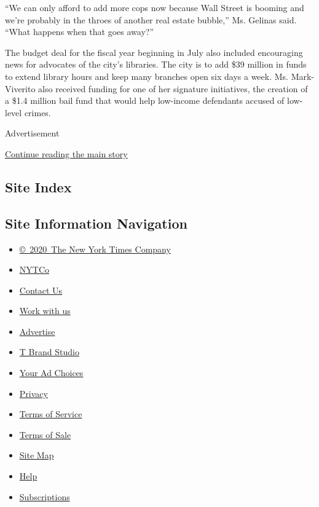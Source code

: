``We can only afford to add more cops now because Wall Street is booming
and we're probably in the throes of another real estate bubble,'' Ms.
Gelinas said. ``What happens when that goes away?''

The budget deal for the fiscal year beginning in July also included
encouraging news for advocates of the city's libraries. The city is to
add \$39 million in funds to extend library hours and keep many branches
open six days a week. Ms. Mark-Viverito also received funding for one of
her signature initiatives, the creation of a \$1.4 million bail fund
that would help low-income defendants accused of low-level crimes.

Advertisement

\protect\hyperlink{after-bottom}{Continue reading the main story}

\hypertarget{site-index}{%
\subsection{Site Index}\label{site-index}}

\hypertarget{site-information-navigation}{%
\subsection{Site Information
Navigation}\label{site-information-navigation}}

\begin{itemize}
\tightlist
\item
  \href{https://help.nytimes3xbfgragh.onion/hc/en-us/articles/115014792127-Copyright-notice}{©~2020~The
  New York Times Company}
\end{itemize}

\begin{itemize}
\tightlist
\item
  \href{https://www.nytco.com/}{NYTCo}
\item
  \href{https://help.nytimes3xbfgragh.onion/hc/en-us/articles/115015385887-Contact-Us}{Contact
  Us}
\item
  \href{https://www.nytco.com/careers/}{Work with us}
\item
  \href{https://nytmediakit.com/}{Advertise}
\item
  \href{http://www.tbrandstudio.com/}{T Brand Studio}
\item
  \href{https://www.nytimes3xbfgragh.onion/privacy/cookie-policy\#how-do-i-manage-trackers}{Your
  Ad Choices}
\item
  \href{https://www.nytimes3xbfgragh.onion/privacy}{Privacy}
\item
  \href{https://help.nytimes3xbfgragh.onion/hc/en-us/articles/115014893428-Terms-of-service}{Terms
  of Service}
\item
  \href{https://help.nytimes3xbfgragh.onion/hc/en-us/articles/115014893968-Terms-of-sale}{Terms
  of Sale}
\item
  \href{https://spiderbites.nytimes3xbfgragh.onion}{Site Map}
\item
  \href{https://help.nytimes3xbfgragh.onion/hc/en-us}{Help}
\item
  \href{https://www.nytimes3xbfgragh.onion/subscription?campaignId=37WXW}{Subscriptions}
\end{itemize}
